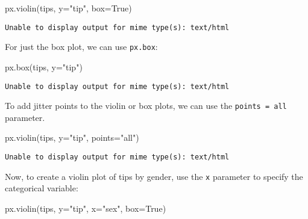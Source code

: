 \documentclass[
  letterpaper,
  DIV=11,
  numbers=noendperiod]{scrreprt}
\newenvironment{Shaded}{\begin{snugshade}}{\end{snugshade}}
\newcommand{\NormalTok}[1]{\textcolor[rgb]{0.00,0.23,0.31}{#1}}
\newcommand{\OperatorTok}[1]{\textcolor[rgb]{0.37,0.37,0.37}{#1}}
\newcommand{\StringTok}[1]{\textcolor[rgb]{0.13,0.47,0.30}{#1}}
\newcommand{\VariableTok}[1]{\textcolor[rgb]{0.07,0.07,0.07}{#1}}
\begin{document}
\begin{Shaded}
\begin{Highlighting}[]
\NormalTok{px.violin(tips, y}\OperatorTok{=}\StringTok{"tip"}\NormalTok{, box}\OperatorTok{=}\VariableTok{True}\NormalTok{)}
\end{Highlighting}
\end{Shaded}

\begin{verbatim}
Unable to display output for mime type(s): text/html
\end{verbatim}

For just the box plot, we can use \texttt{px.box}:

\begin{Shaded}
\begin{Highlighting}[]
\NormalTok{px.box(tips, y}\OperatorTok{=}\StringTok{"tip"}\NormalTok{)}
\end{Highlighting}
\end{Shaded}

\begin{verbatim}
Unable to display output for mime type(s): text/html
\end{verbatim}

To add jitter points to the violin or box plots, we can use the
\texttt{points\ =\ \textquotesingle{}all\textquotesingle{}} parameter.

\begin{Shaded}
\begin{Highlighting}[]
\NormalTok{px.violin(tips, y}\OperatorTok{=}\StringTok{"tip"}\NormalTok{, points}\OperatorTok{=}\StringTok{"all"}\NormalTok{)}
\end{Highlighting}
\end{Shaded}

\begin{verbatim}
Unable to display output for mime type(s): text/html
\end{verbatim}

Now, to create a violin plot of tips by gender, use the \texttt{x}
parameter to specify the categorical variable:

\begin{Shaded}
\begin{Highlighting}[]
\NormalTok{px.violin(tips, y}\OperatorTok{=}\StringTok{"tip"}\NormalTok{, x}\OperatorTok{=}\StringTok{"sex"}\NormalTok{, box}\OperatorTok{=}\VariableTok{True}\NormalTok{)}
\end{Highlighting}
\end{Shaded}
\end{document}

